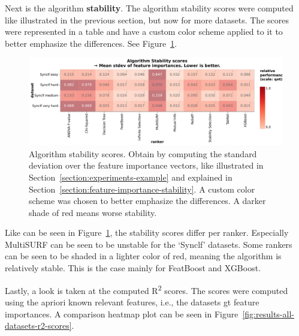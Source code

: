 \documentclass[../main.tex]{subfiles}
\begin{document}
Next is the algorithm \textbf{stability}. The algorithm stability scores were computed like illustrated in the previous section, but now for more datasets. The scores were represented in a table and have a custom color scheme applied to it to better emphasize the differences. See Figure~\ref{fig:results-all-datasets-stability-scores}.

\begin{figure}[ht]
    \centering
    \includegraphics[width=\linewidth]{report/images/results-all-datasets-stability-scores.pdf}
    \caption{Algorithm stability scores. Obtain by computing the standard deviation over the feature importance vectors, like illustrated in Section~\ref{section:experiments-example} and explained in Section~\ref{section:feature-importance-stability}. A custom color scheme was chosen to better emphasize the differences. A darker shade of red means worse stability.}
    \label{fig:results-all-datasets-stability-scores}
\end{figure}

Like can be seen in Figure~\ref{fig:results-all-datasets-stability-scores}, the stability scores differ per ranker. Especially MultiSURF can be seen to be unstable for the `Synclf' datasets. Some rankers can be seen to be shaded in a lighter color of red, meaning the algorithm is relatively stable. This is the case mainly for FeatBoost and XGBoost.

Lastly, a look is taken at the computed R\textsuperscript{2} scores. The scores were computed using the \gls{apriori} known relevant features, i.e., the datasets \gls{gt} feature importances. A comparison heatmap plot can be seen in Figure~\ref{fig:results-all-datasets-r2-scores}.
\end{document}
